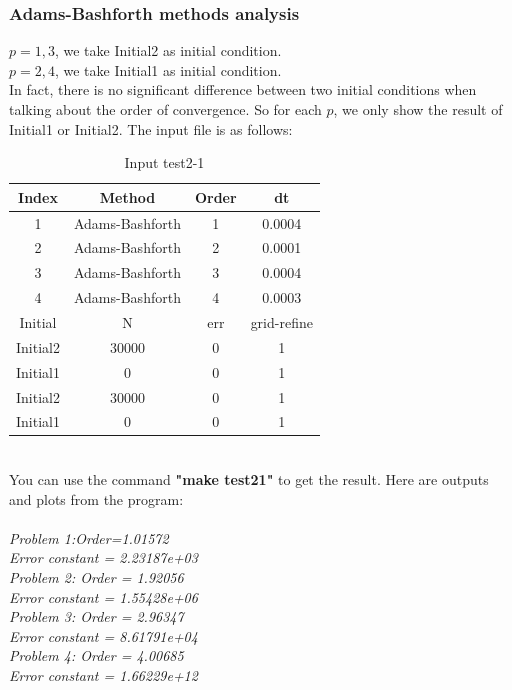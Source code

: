 \documentclass[a4paper,twocolumn]{article}
\theoremstyle{definition}
\begin{document}
\subsubsection{Adams-Bashforth methods analysis}
$p = 1,3$, we take Initial2 as initial condition.\\
$p = 2,4$, we take Initial1 as initial condition.\\
In fact, there is no significant difference between two initial conditions when talking about the order of convergence. So for each $p$, we only show the result of Initial1 or Initial2. The input file is as follows:
\begin{table}[!htp]
	\centering
	\begin{tabular}{|c|c|c|c|}
		\hline	
		Index & Method & Order & dt \\
		\hline		
		1 & Adams-Bashforth & 1 & 0.0004   \\	
		\hline		
		2 & Adams-Bashforth & 2 & 0.0001   \\
		\hline		
		3 & Adams-Bashforth & 3 & 0.0004   \\	
		\hline		
		4 & Adams-Bashforth & 4 & 0.0003   \\	
		\hline \hline
		Initial & N & err & grid-refine \\
		\hline
		Initial2 & 30000 & 0 & 1 \\
		\hline
		Initial1 & 0 & 0 & 1 \\
		\hline
		Initial2 & 30000 & 0 & 1 \\
		\hline
		Initial1 & 0 & 0 & 1 \\
		\hline
	\end{tabular}
	\caption{Input test2-1}
	\label{tab:test21}
\end{table}\\
You can use the command \textbf{"make test21"} to get the result. Here are outputs and plots from the program:\\\\
\emph{Problem 1:Order=1.01572}\\
\emph{Error constant = 2.23187e+03}\\
\emph{Problem 2: Order = 1.92056}\\
\emph{Error constant = 1.55428e+06}\\
\emph{Problem 3: Order = 2.96347}\\
\emph{Error constant = 8.61791e+04}\\
\emph{Problem 4: Order = 4.00685}\\
\emph{Error constant = 1.66229e+12}
\end{document}
